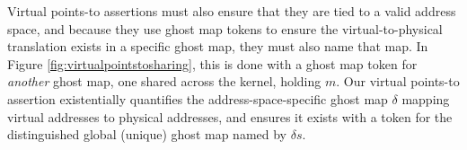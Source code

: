 Virtual points-to assertions must also ensure that they are tied to a valid address space, and because they
use ghost map tokens to ensure the virtual-to-physical translation exists in a specific ghost map, they must also
name that map. In Figure \ref{fig:virtualpointstosharing}, this is done with a ghost map token for \emph{another} ghost map,
one shared across the kernel, holding $m$. Our virtual points-to assertion existentially quantifies the address-space-specific
ghost map $\delta$ mapping virtual addresses to physical addresses, and ensures it exists with a token for the distinguished
global (unique) ghost map named by $\delta{s}$.
  

